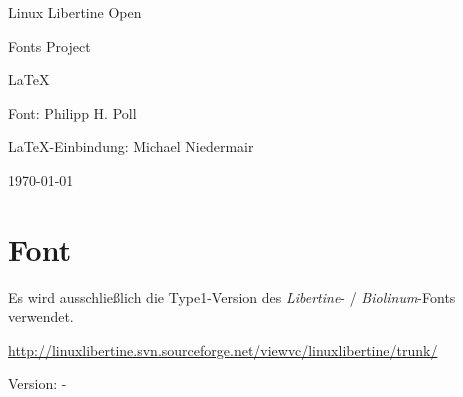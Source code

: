 \documentclass{fontdokuold}
\begin{document}
\thispagestyle{empty}

\begin{minipage}{\linewidth}\fontsize{36pt}{40pt}\FontLibertine
   \textcolor{red}{}\quad%
   \fontsize{36pt}{40pt}\FontLibertine%
    Linux Libertine Open\par
   \hfill\fontsize{36pt}{40pt}\FontLibertine%
   Fonts Project\quad%
   \fontsize{36pt}{40pt}\FontLibertine%
   \textcolor{red}{}\par
   \centering%
\end{minipage}

\vfill
\begin{center}
   \fontsize{46pt}{46pt}\FontLibertine%
   \LaTeX
\end{center}

\vfill
\begin{center}\fontsize{20pt}{18pt}\FontLibertine
Font: Philipp H. Poll\par \LaTeX-Einbindung: Michael Niedermair
\end{center}

\vfill
\begin{center}
{\fontsize{6cm}{6cm}\FontLibertine%
}%
\hfill\fontsize{20pt}{18pt}\FontLibertine\today
\end{center}
\newpage

\tableofcontents
\newpage

\chapter{Font}

Es wird ausschließlich die Type1-Version des \emph{Libertine}- / \emph{Biolinum}-Fonts verwendet.




\begin{description}
\item[Font] \url{http://linuxlibertine.svn.sourceforge.net/viewvc/linuxlibertine/trunk/}
\item[libertine] Version: \libertineVersionDate\space-\space\libertineVersion
\end{description}
\end{document}
